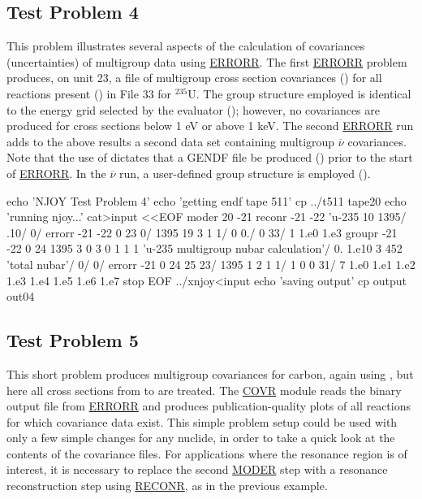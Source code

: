 \subsection{Test Problem 4}
\label{ssMandT_4}

This problem illustrates several aspects of the calculation of
covariances (uncertainties) of multigroup data using
\hyperlink{sERRORRhy}{ERRORR}. The first
\hyperlink{sERRORRhy}{ERRORR} problem produces, on unit 23,
a file of multigroup cross section covariances
() for all reactions present ()
in File 33 for $^{235}$U.  The group structure employed is identical
to the energy grid selected by the evaluator ();
however, no covariances are produced for cross sections below 1 eV
or above 1 keV.  The second \hyperlink{sERRORRhy}{ERRORR}
run adds to the above results a second data set containing
multigroup $\overline{\nu}$ covariances.  Note that the
use of  dictates that a GENDF file be
produced () prior to the start of
\hyperlink{sERRORRhy}{ERRORR}.  In the
$\overline{\nu}$ run, a user-defined group structure is employed
().

\small
\begin{ccode}

echo 'NJOY Test Problem 4'
echo 'getting endf tape 511'
cp ../t511 tape20
echo 'running njoy...'
cat>input <<EOF
 moder
 20 -21
 reconr
 -21 -22
 'u-235 10%
 1395/
 .10/
 0/
 errorr
 -21 -22 0 23 0/
 1395 19 3 1 1/
 0 0./
 0 33/
 1
 1.e0 1.e3
 groupr
 -21 -22 0 24
 1395 3 0 3 0 1 1 1
 'u-235 multigroup nubar calculation'/
 0.
 1.e10
 3 452 'total nubar'/
 0/
 0/
 errorr
 -21 0 24 25 23/
 1395 1 2 1 1/
 1 0
 0 31/
 7
 1.e0 1.e1 1.e2 1.e3 1.e4 1.e5 1.e6 1.e7
 stop
EOF
../xnjoy<input
echo 'saving output'
cp output out04

\end{ccode}
\normalsize

\subsection{Test Problem 5}
\label{ssMandT_5}

This short problem produces multigroup covariances for carbon,
again using , but here all cross sections from
 to  are treated.  The
\hyperlink{sCOVRhy}{COVR} module
reads the binary output file from
\hyperlink{sERRORRhy}{ERRORR} and produces
publication-quality plots of all reactions for which
covariance data exist.  This simple problem setup could be used with
only a few simple changes for any nuclide, in order to take a quick
look at the contents of the covariance files.  For applications
where the resonance region is of interest, it is necessary to replace
the second \hyperlink{sMODERhy}{MODER} step with a
resonance reconstruction step using
\hyperlink{sRECONRhy}{RECONR}, as in the previous example.

